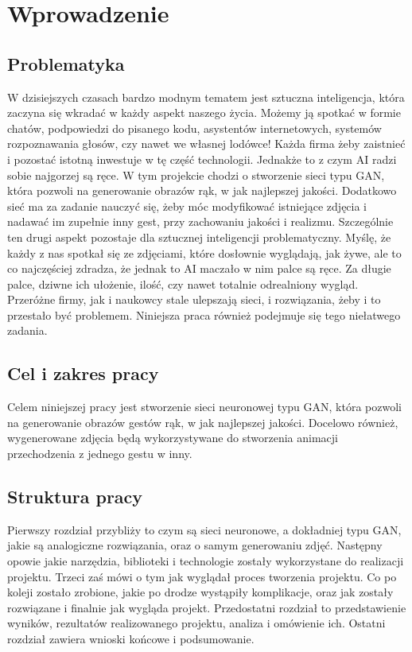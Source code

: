 \documentclass[12pt]{article}
\begin{document}
\begin{sloppypar}


\tableofcontents
\newpage

\section{Wprowadzenie}
{
  \subsection{Problematyka}
  {
    W dzisiejszych czasach bardzo modnym tematem jest sztuczna inteligencja, która zaczyna się wkradać w każdy aspekt naszego życia.
    Możemy ją spotkać w formie chatów, podpowiedzi do pisanego kodu, asystentów internetowych, systemów rozpoznawania głosów, czy nawet we własnej lodówce!
    Każda firma żeby zaistnieć i pozostać istotną inwestuje w tę część technologii. Jednakże to z czym AI radzi sobie najgorzej są ręce.
    \newline
    W tym projekcie chodzi o stworzenie sieci typu GAN, która pozwoli na generowanie obrazów rąk, w jak najlepszej jakości.
    Dodatkowo sieć ma za zadanie nauczyć się, żeby móc modyfikować istniejące zdjęcia i nadawać im zupełnie inny gest, przy zachowaniu jakości i realizmu.
    Szczególnie ten drugi aspekt pozostaje dla sztucznej inteligencji problematyczny. 
    Myślę, że każdy z nas spotkał się ze zdjęciami, które dosłownie wyglądają, jak żywe, ale to co najczęściej zdradza, że jednak to AI maczało w nim palce są ręce.
    Za długie palce, dziwne ich ułożenie, ilość, czy nawet totalnie odrealniony wygląd. 
    Przeróżne firmy, jak i naukowcy stale ulepszają sieci, i rozwiązania, żeby i to przestało być problemem.
    Niniejsza praca również podejmuje się tego niełatwego zadania.
  }
  \subsection{Cel i zakres pracy}
  {
    Celem niniejszej pracy jest stworzenie sieci neuronowej typu GAN, 
    która pozwoli na generowanie obrazów gestów rąk, w jak najlepszej jakości.
    \newline
    Docelowo również, wygenerowane zdjęcia będą wykorzystywane do stworzenia animacji przechodzenia z jednego gestu w inny.
  }
  \subsection{Struktura pracy}
  {
    Pierwszy rozdział przybliży to czym są sieci neuronowe, a dokładniej typu GAN, jakie są analogiczne rozwiązania, oraz o samym generowaniu zdjęć.
    Następny opowie jakie narzędzia, biblioteki i technologie zostały wykorzystane do realizacji projektu. 
    Trzeci zaś mówi o tym jak wyglądał proces tworzenia projektu. Co po koleji zostało zrobione, jakie po drodze wystąpiły komplikacje, oraz jak zostały rozwiązane i finalnie jak wygląda projekt.
    Przedostatni rozdział to przedstawienie wyników, rezultatów realizowanego projektu, analiza i omówienie ich.
    Ostatni rozdział zawiera wnioski końcowe i podsumowanie.
  }
}


\end{sloppypar}
\end{document}
